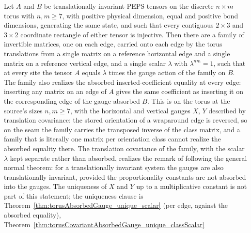 \begin{theorem}%
    \label{thm:fundamentalTheorem_normalTorusPEPS_unconditional}
    \leanok
    Let $A$ and $B$ be translationally invariant PEPS tensors on the discrete
    $n\times m$ torus with $n,m\geq 7$, with positive physical dimension, equal
    and positive bond dimensions,
    generating the same state, and such that every contiguous $2\times 3$ and
    $3\times 2$ coordinate rectangle of either tensor is injective. Then there
    are a family of invertible matrices, one on each edge, carried onto each
    edge by the torus translations from a single matrix on a reference
    horizontal edge and a single matrix on a reference vertical edge, and a
    single scalar $\lambda$ with $\lambda^{nm}=1$, such that at every site the
    tensor $A$ equals $\lambda$ times the gauge action of the family on $B$.
    The family also realizes the absorbed inserted-coefficient equality at
    every edge: inserting any matrix on an edge of $A$ gives the same
    coefficient as inserting it on the corresponding edge of the gauge-absorbed
    $B$.
    This is \cite[Theorem~3]{Molnar2018NormalPEPS} on the torus at the source's
    sizes $n,m\geq 7$, with the horizontal and vertical gauges $X$, $Y$
    described by translation covariance: the stored orientation of a
    wraparound edge is reversed, so on the seam the family carries the
    transposed inverse of the class matrix, and a family that is literally one
    matrix per orientation class cannot realize the absorbed equality there.
    The translation covariance of the family, with the scalar $\lambda$ kept
    separate rather than absorbed, realizes the remark of
    \cite{Molnar2018NormalPEPS} following the general normal theorem: for a
    translationally invariant system the gauges are also translationally
    invariant, provided the proportionality constants are not absorbed into
    the gauges.
    The uniqueness of $X$ and $Y$ up to a multiplicative constant is not part
    of this statement; the uniqueness clause is
    Theorem~\ref{thm:torusAbsorbedGauge_unique_scalar} (per edge, against the
    absorbed equality), Theorem~\ref{thm:torusCovariantAbsorbedGauge_unique_classScalar}

\end{theorem}
